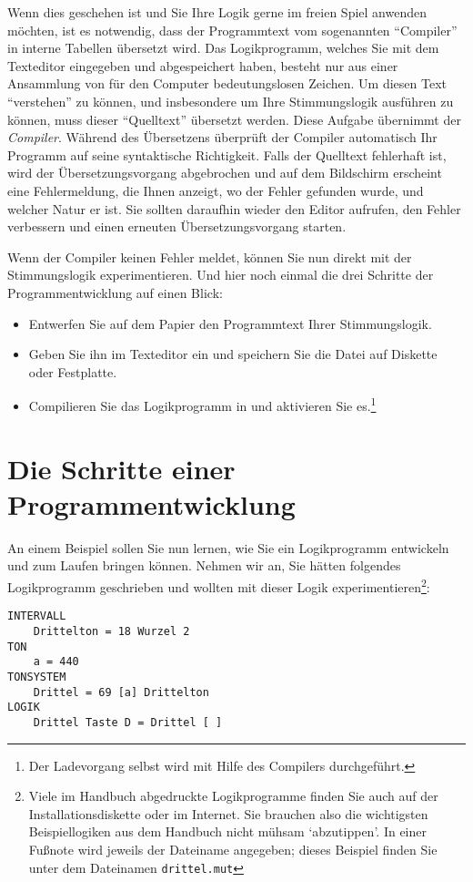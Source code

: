 Wenn dies geschehen ist und Sie Ihre Logik gerne im freien Spiel
anwenden möchten, ist es notwendig, dass der Programmtext vom
sogenannten "`Compiler"' in interne Tabellen übersetzt wird. Das
Logikprogramm, welches Sie mit dem Texteditor eingegeben und
abgespeichert haben, besteht nur aus einer Ansammlung von für den
Computer bedeutungslosen Zeichen. Um diesen Text "`verstehen"' zu
können, und insbesondere um Ihre Stimmungslogik ausführen zu können,
muss dieser "`Quelltext"' übersetzt werden.  Diese Aufgabe übernimmt
der \emph{Compiler}. Während des Übersetzens überprüft der Compiler
automatisch Ihr Programm auf seine syntaktische Richtigkeit. Falls der
Quelltext fehlerhaft ist, wird der Übersetzungsvorgang abgebrochen und
auf dem Bildschirm erscheint eine Fehlermeldung, die Ihnen anzeigt, wo
der Fehler gefunden wurde, und welcher Natur er ist. Sie sollten
daraufhin wieder den Editor aufrufen, den Fehler verbessern und einen
erneuten Übersetzungsvorgang  starten.

Wenn der Compiler keinen Fehler meldet, können Sie nun direkt mit der Stimmungslogik
experimentieren. Und
hier noch einmal die drei Schritte der Programmentwicklung auf
einen Blick:
\begin{itemize}
\item Entwerfen Sie auf dem Papier den Programmtext Ihrer
  Stimmungslogik.
\item Geben Sie ihn im Texteditor ein und speichern Sie die Datei auf
  Diskette oder Festplatte.
\item Compilieren Sie das Logikprogramm in \mutabor{} und aktivieren Sie
  es.\footnote{Der Ladevorgang selbst wird mit Hilfe des Compilers
    durchgeführt.}
\end{itemize}

\section{Die Schritte einer Pro\-gramm\-ent\-wick\-lung}\label{sec:die-schritte-einer}

An einem Beispiel sollen Sie nun lernen, wie Sie ein Logikprogramm
entwickeln und zum Laufen bringen können.  Nehmen wir an, Sie hätten
folgendes Logikprogramm geschrieben und wollten mit dieser Logik
experimentieren\footnote{Viele im Handbuch abgedruckte Logikprogramme
  finden Sie auch auf der Installationsdiskette oder im Internet. Sie
  brauchen also die wichtigsten Beispiellogiken aus dem Handbuch nicht
  mühsam `abzutippen'. In einer Fußnote wird jeweils der Dateiname
  angegeben; dieses Beispiel finden Sie unter dem Dateinamen
  \texttt{drittel.mut}}:
\label{DRITTEL}
\begin{verbatim}
INTERVALL
    Drittelton = 18 Wurzel 2
TON
    a = 440
TONSYSTEM
    Drittel = 69 [a] Drittelton
LOGIK
    Drittel Taste D = Drittel [ ]
\end{verbatim}

